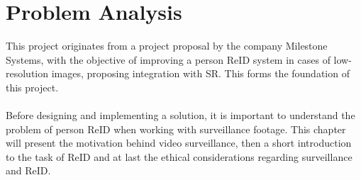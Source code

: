 \chapter{Problem Analysis}
\label{cha:problemanalysis}
This project originates from a project proposal by the company Milestone Systems, with the objective of improving a person \acf{ReID} system in cases of low-resolution images, proposing integration with \acf{SR}. This forms the foundation of this project.
\\\\
Before designing and implementing a solution, it is important to understand the problem of person \ac{ReID} when working with surveillance footage. This chapter will present the motivation behind video surveillance, then a short introduction to the task of \ac{ReID} and at last the ethical considerations regarding surveillance and \ac{ReID}. 

